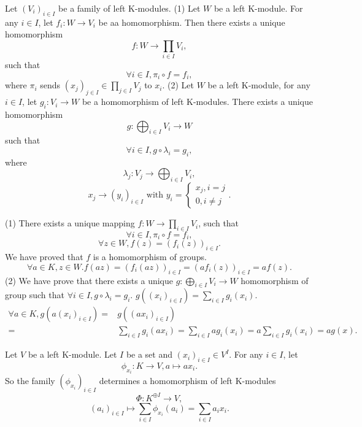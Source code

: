 \documentclass{book}
\numberwithin{equation}{section}
\begin{document}
\begin{propositionenv}
    Let $(V_i)_{i\in I}$ be a family of left K-modules.
    \newline
    (1) Let $W$ be a left K-module. For any $i\in I$,  let $f_i:W\rightarrow V_i$ be aa homomorphism. Then there exists a unique homomorphism 
    $$f:W\longrightarrow \prod_{i\in I}V_i, $$ 
    such that 
    $$\forall i\in I, \pi_i\circ f=f_i, $$
    where $\pi_i$ sends $(x_j)_{j\in I}\in \prod_{j\in I}V_j$ to $x_i$.
    \newline
    (2) Let $W$ be a left K-module,  for any $i\in I$,  let $g_i:V_i\rightarrow W$ be a homomorphism of left K-modules. There exists a unique homomorphism
    $$g:\bigoplus_{i\in I}V_i\longrightarrow W$$
    such that 
    $$\forall i\in I,  g\circ\lambda_i=g_i, $$
    where
    $$\lambda_j:V_j\longrightarrow\bigoplus_{i\in I}V_i, $$
    $$x_j\longrightarrow (y_i)_{i\in I} \text{ with } y_i=\left\{\begin{matrix}
        x_j, i=j\\0, i\not=j
    \end{matrix}\right. .$$
\end{propositionenv}
\begin{proofenv}
    \quad
    \newline
    (1) There exists a unique mapping $f:W\rightarrow \prod_{i\in I}V_i$,  such that 
    $$\forall i\in I, \pi_i\circ f=f_i, $$
    $$\forall z\in W, f(z)=(f_i(z))_{i\in I}.$$
    We have proved that $f$ is a homomorphism of groups.
    $$\forall a\in K, z\in W. f(az)=(f_i(az))_{i\in I}=(af_i(z))_{i\in I}=af(z).$$
    (2) We have prove that there exists a unique $g:\bigoplus_{i\in I}V_i\rightarrow W$ homomorphism of group such that $\forall i\in I,  g\circ \lambda_i=g_i.$ $g\left((x_i)_{i\in I}\right)=\sum_{i\in I}g_i(x_i)$.
    \begin{align*}
        \forall a\in K, g\left(a(x_i)_{i\in I}\right)=&g\left((ax_i)_{i\in I}\right)\\
        =&\sum_{i\in I}g_i(ax_i)=\sum_{i\in I}ag_i(x_i)
        =a\sum_{i\in I}g_i(x_i)=ag(x).
    \end{align*}
\end{proofenv}
\begin{applicationenv}
Let $V$ be a left K-module. Let $I$ be a set and $(x_i)_{i\in I}\in V^{I}$. For any $i\in I$,  let 
$$\phi_{x_i}:K\longrightarrow V, a\mapsto ax_i.$$ 
So the family $(\phi_{x_i})_{i\in I}$ determines a homomorphism of left K-modules 
$$\Phi:K^{\oplus I}\longrightarrow V, $$
$$(a_i)_{i\in I}\longmapsto \sum_{i\in I}\phi_{x_i}(a_i)=\sum_{i\in I}a_ix_i.$$
\end{applicationenv}
\end{document}

